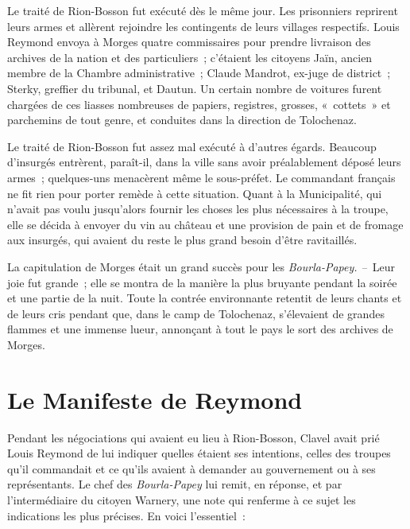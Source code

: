 \documentclass[french,twoside]{book} %
\begin{document}
Le traité de Rion-Bosson fut exécuté dès le même jour. Les prisonniers reprirent leurs armes et allèrent rejoindre les contingents de leurs villages respectifs. Louis Reymond envoya à Morges quatre commissaires pour prendre livraison des archives de la nation et des particuliers ; c’étaient les citoyens Jaïn, ancien membre de la Chambre administrative ; Claude Mandrot, ex-juge de district ; Sterky, greffier du tribunal, et Dautun. Un certain nombre de voitures furent chargées de ces liasses nombreuses de papiers, registres, grosses, « cottets » et parchemins de tout genre, et conduites dans la direction de Tolochenaz.\par
Le traité de Rion-Bosson fut assez mal exécuté à d’autres égards. Beaucoup d’insurgés entrèrent, paraît-il, dans la ville sans avoir préalablement déposé leurs armes ; quelques-uns menacèrent même le sous-préfet. Le commandant français ne fit rien pour porter remède à cette situation. Quant à la Municipalité, qui n’avait pas voulu jusqu’alors fournir les choses les plus nécessaires à la troupe, elle se décida à envoyer du vin au château et une provision de pain et de fromage aux insurgés, qui avaient du reste le plus grand besoin d’être ravitaillés.\par
La capitulation de Morges était un grand succès pour les \emph{Bourla-Papey. –} Leur joie fut grande ; elle se montra de la manière la plus bruyante pendant la soirée et une partie de la nuit. Toute la contrée environnante retentit de leurs chants et de leurs cris pendant que, dans le camp de Tolochenaz, s’élevaient de grandes flammes et une immense lueur, annonçant à tout le pays le sort des archives de Morges.
\section[Le Manifeste de Reymond]{Le Manifeste de Reymond}
\noindent Pendant les négociations qui avaient eu lieu à Rion-Bosson, Clavel avait prié Louis Reymond de lui indiquer quelles étaient ses intentions, celles des troupes qu’il commandait et ce qu’ils avaient à demander au gouvernement ou à ses représentants. Le chef des \emph{Bourla-Papey} lui remit, en réponse, et par l’intermédiaire du citoyen Warnery, une note qui renferme à ce sujet les indications les plus précises. En voici l’essentiel :\par
\end{document}
